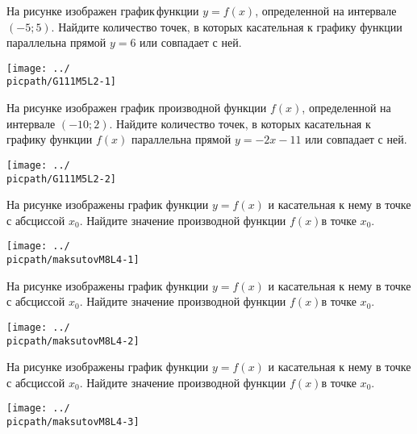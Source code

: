 \begin{class}[number=3]
\begin{listofex}
		\item
		\begin{minipage}[t]{\bodywidth}
			На рисунке изображен график функции \( y = f(x)\), определенной на интервале \((-5; 5)\). Найдите количество точек, в которых касательная к графику функции параллельна прямой \(y  =  6\) или совпадает с ней.
		\end{minipage}
		\hspace{0.02\linewidth}
		\begin{minipage}[t]{\picwidth}
			\texttt{[image: ../\\picpath/G111M5L2-1]}
		\end{minipage}
		\item
		\begin{minipage}[t]{\bodywidth}
			На рисунке изображен график производной функции \(f(x)\), определенной на интервале \((-10; 2)\). Найдите количество точек, в которых касательная к графику функции \(f(x)\) параллельна прямой \(y = -2x - 11\) или совпадает с ней.
		\end{minipage}
		\hspace{0.02\linewidth}
		\begin{minipage}[t]{\picwidth}
			\texttt{[image: ../\\picpath/G111M5L2-2]}
		\end{minipage}
		\item
		\begin{minipage}[t]{\bodywidth}
			На рисунке изображены график функции \(y=f(x)\) и касательная к нему в точке с абсциссой \(x_0\). Найдите значение производной функции \(f(x)\)в точке \(x_0\).
		\end{minipage}
		\hspace{0.02\linewidth}
		\begin{minipage}[t]{\picwidth}
			\texttt{[image: ../\\picpath/maksutovM8L4-1]}
		\end{minipage}
		\item
		\begin{minipage}[t]{\bodywidth}
			На рисунке изображены график функции \(y=f(x)\) и касательная к нему в точке с абсциссой \(x_0\). Найдите значение производной функции \(f(x)\)в точке \(x_0\).
		\end{minipage}
		\hspace{0.02\linewidth}
		\begin{minipage}[t]{\picwidth}
			\texttt{[image: ../\\picpath/maksutovM8L4-2]}
		\end{minipage}
		\item
		\begin{minipage}[t]{\bodywidth}
			На рисунке изображены график функции \(y=f(x)\) и касательная к нему в точке с абсциссой \(x_0\). Найдите значение производной функции \(f(x)\)в точке \(x_0\).
		\end{minipage}
		\hspace{0.02\linewidth}
		\begin{minipage}[t]{\picwidth}
			\texttt{[image: ../\\picpath/maksutovM8L4-3]}
		\end{minipage}
	\end{listofex}
\end{class}
